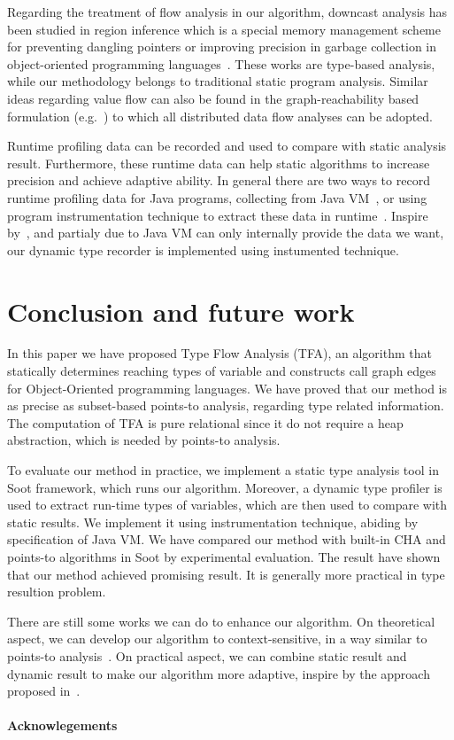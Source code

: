 \documentclass{fac}
\begin{document}
Regarding the treatment of flow analysis in our algorithm, downcast analysis has been studied in region inference which is a special memory management scheme for preventing dangling pointers or improving precision in garbage collection in object-oriented programming languages~\cite{Boyapati2003,Chin2004}.  These works are type-based analysis, while our methodology belongs to traditional static program analysis. Similar ideas regarding value flow can also be found in the graph-reachability based formulation (e.g.~\cite{Reps1997,Lu2013}) to which all distributed data flow analyses can be adopted.

Runtime profiling data can be recorded and used to compare with static analysis result. Furthermore, these runtime data can help static algorithms to increase precision and achieve adaptive ability. In general there are two ways to record runtime profiling data for Java programs, collecting from Java VM~\cite{Codrut2014}, or using program instrumentation technique to extract these data in runtime~\cite{Vijay2000}. Inspire by~\cite{Vijay2000}, and partialy due to Java VM can only internally provide the data we want, our dynamic type recorder is implemented using instumented technique.

\section{Conclusion and future work}\label{sec:conclusion}
In this paper we have proposed Type Flow Analysis (TFA), an algorithm that statically determines reaching types of variable and constructs call graph edges for Object-Oriented programming languages. We have proved that our method is as precise as subset-based points-to analysis, regarding type related information. The computation of TFA is pure relational since it do not require a heap abstraction, which is needed by points-to analysis. 

To evaluate our method in practice, we implement a static type analysis tool in Soot framework, which runs our algorithm. Moreover, a dynamic type profiler is used to extract run-time types of variables, which are then used to compare with static results. We implement it using instrumentation technique, abiding by specification of Java VM. We have compared our method with built-in CHA and points-to algorithms in Soot by experimental evaluation. The result have shown that our method achieved promising result. It is generally more practical in type resultion problem.

There are still some works we can do to enhance our algorithm. On theoretical aspect, we can develop our algorithm to context-sensitive, in a way similar to points-to analysis~\cite{Ana2005,Yannis2011}. On practical aspect, we can combine static result and dynamic result to make our algorithm more adaptive, inspire by the approach proposed in~\cite{Codrut2014}.

\paragraph{Acknowlegements}
\label{lastpage}
\end{document}

